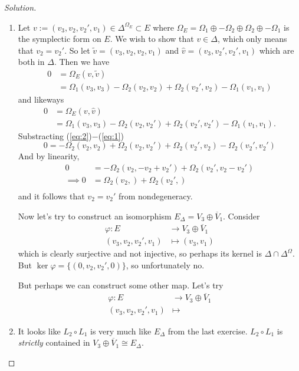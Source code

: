 \begin{proof}[Solution]\leavevmode
	\begin{enumerate}[label=\alph*.]
		\item Let $v:=(v_3,v_2,v_2',v_1)\in \Delta^{\Omega_E}\subset E$ where  $\Omega_E=\Omega_1\oplus -\Omega_2\oplus \Omega_2\oplus -\Omega_1$ is the symplectic form on $E$. We wish to show that $v\in \Delta$, which only means that $v_2=v_2'$. So let $\tilde{v}=(v_3,v_2,v_2,v_1)$ and $\hat{v}=(v_3,v_2',v_2',v_1)$ which are both in $\Delta$. Then we have
			\begin{align}\label{eq:1}
				0&=\Omega_E(v,\tilde{v})\\
				& =\Omega_1(v_3,v_3)-\Omega_2(v_2,v_2)+\Omega_{2}(v_2',v_2)-\Omega_{1}(v_1,v_1)
			\end{align}
and likeways
			\begin{align}\label{eq:2}
				0&=\Omega_E(v,\hat{v})\\
				& =\Omega_1(v_3,v_3)-\Omega_2(v_2,v_2')+\Omega_{2}(v_2',v_2')-\Omega_{1}(v_1,v_1).
			\end{align}
Substracting (\ref{eq:2})$-$(\ref{eq:1})
\[0=-\Omega_2(v_2,v_2)+\Omega_2(v_2,v_2')+\Omega_2(v_2',v_2)-\Omega_2(v_2',v_2')\]
And by linearity,
\begin{align*}
0&=-\Omega_2(v_2,-v_2+v_2')+\Omega_2(v_2',v_2-v_2')\\
\implies 0&=\Omega_2(v_2,)+\Omega_2(v_2',) \\
\end{align*}
and it follows that $v_2=v_2'$ from nondegeneracy.

Now let's try to construct an isomorphism $E_{\Delta}=V_3\oplus \overline{V}_{1}$. Consider
\begin{align*}
	\varphi: E &\longrightarrow V_3\oplus \overline{V}_{1} \\
	(v_3,v_2,v_2',v_1) &\longmapsto (v_3,v_1)
\end{align*}
which is clearly surjective and not injective, so perhaps its kernel is $ \Delta \cap \Delta^{\Omega}$. But $\ker \varphi=\{(0,v_2,v_2',0)\}$, so unfortunately no.

But perhaps we can construct some other map. Let's try
\begin{align*}
	\varphi: E &\longrightarrow V_3\oplus \overline{V}_{1} \\
	(v_3,v_2,v_2',v_1) &\longmapsto 
\end{align*}

	\item It looks like $L_2\circ L_1$ is very much like $E_\Delta$ from the last exercise. $L_2\circ L_1$ is \textit{strictly}  contained in $V_3\oplus \overline{V}_1\cong E_\Delta$.


\end{enumerate}
\end{proof}
